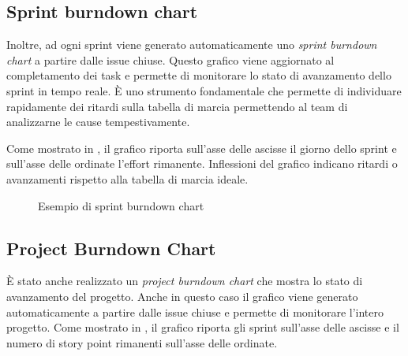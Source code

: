 \subsection{Sprint burndown chart}
Inoltre, ad ogni sprint viene generato automaticamente uno \emph{sprint burndown chart} a partire dalle issue chiuse. Questo grafico viene aggiornato al completamento dei task e permette di monitorare lo stato di avanzamento dello sprint in tempo reale.
È uno strumento fondamentale che permette di individuare rapidamente dei ritardi sulla tabella di marcia permettendo al team di analizzarne le cause tempestivamente.

Come mostrato in , il grafico riporta sull'asse delle ascisse il giorno dello sprint e sull'asse delle ordinate l'effort rimanente. Inflessioni del grafico indicano ritardi o avanzamenti rispetto alla tabella di marcia ideale.

\begin{figure}
\centering
{}
\caption{Esempio di sprint burndown chart}
\label{fig:sprint-burndown-chart}
\end{figure}

\subsection{Project Burndown Chart}
È stato anche realizzato un \emph{project burndown chart} che mostra lo stato di avanzamento del progetto. 
Anche in questo caso il grafico viene generato automaticamente a partire dalle issue chiuse e permette di monitorare l'intero progetto.
Come mostrato in , il grafico riporta gli sprint sull'asse delle ascisse e il numero di story point rimanenti sull'asse delle ordinate.

